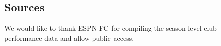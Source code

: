 \documentclass[USenglish]{article}
\begin{document}
\subsection{Sources} 


 

\begin{acknowledgement}
We would like to thank ESPN FC for compiling the season-level club performance data and allow public access.
\end{acknowledgement}

%

\end{document}
